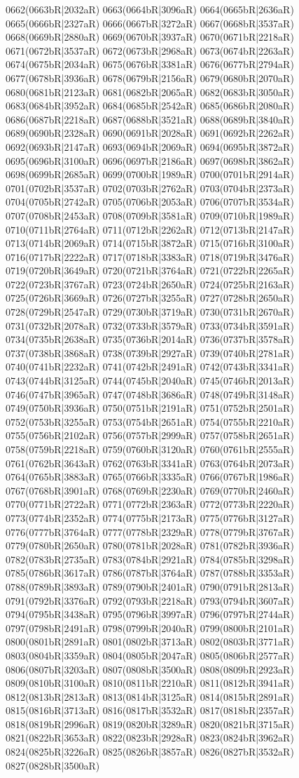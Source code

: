 0662(0663bR|2032aR) 0663(0664bR|3096aR) 0664(0665bR|2636aR) 0665(0666bR|2327aR) 0666(0667bR|3272aR) 0667(0668bR|3537aR) 0668(0669bR|2880aR) 0669(0670bR|3937aR) 0670(0671bR|2218aR) 0671(0672bR|3537aR) 0672(0673bR|2968aR) 0673(0674bR|2263aR) 0674(0675bR|2034aR) 0675(0676bR|3381aR) 0676(0677bR|2794aR) 0677(0678bR|3936aR) 0678(0679bR|2156aR) 0679(0680bR|2070aR) 0680(0681bR|2123aR) 0681(0682bR|2065aR) 0682(0683bR|3050aR) 0683(0684bR|3952aR) 0684(0685bR|2542aR) 0685(0686bR|2080aR) 0686(0687bR|2218aR) 0687(0688bR|3521aR) 0688(0689bR|3840aR) 0689(0690bR|2328aR) 0690(0691bR|2028aR) 0691(0692bR|2262aR) 0692(0693bR|2147aR) 0693(0694bR|2069aR) 0694(0695bR|3872aR) 0695(0696bR|3100aR) 0696(0697bR|2186aR) 0697(0698bR|3862aR) 0698(0699bR|2685aR) 0699(0700bR|1989aR) 0700(0701bR|2914aR) 0701(0702bR|3537aR) 0702(0703bR|2762aR) 0703(0704bR|2373aR) 0704(0705bR|2742aR) 0705(0706bR|2053aR) 0706(0707bR|3534aR) 0707(0708bR|2453aR) 0708(0709bR|3581aR) 0709(0710bR|1989aR) 0710(0711bR|2764aR) 0711(0712bR|2262aR) 0712(0713bR|2147aR) 0713(0714bR|2069aR) 0714(0715bR|3872aR) 0715(0716bR|3100aR) 0716(0717bR|2222aR) 0717(0718bR|3383aR) 0718(0719bR|3476aR) 0719(0720bR|3649aR) 0720(0721bR|3764aR) 0721(0722bR|2265aR) 0722(0723bR|3767aR) 0723(0724bR|2650aR) 0724(0725bR|2163aR) 0725(0726bR|3669aR) 0726(0727bR|3255aR) 0727(0728bR|2650aR) 0728(0729bR|2547aR) 0729(0730bR|3719aR) 0730(0731bR|2670aR) 0731(0732bR|2078aR) 0732(0733bR|3579aR) 0733(0734bR|3591aR) 0734(0735bR|2638aR) 0735(0736bR|2014aR) 0736(0737bR|3578aR) 0737(0738bR|3868aR) 0738(0739bR|2927aR) 0739(0740bR|2781aR) 0740(0741bR|2232aR) 0741(0742bR|2491aR) 0742(0743bR|3341aR) 0743(0744bR|3125aR) 0744(0745bR|2040aR) 0745(0746bR|2013aR) 0746(0747bR|3965aR) 0747(0748bR|3686aR) 0748(0749bR|3148aR) 0749(0750bR|3936aR) 0750(0751bR|2191aR) 0751(0752bR|2501aR) 0752(0753bR|3255aR) 0753(0754bR|2651aR) 0754(0755bR|2210aR) 0755(0756bR|2102aR) 0756(0757bR|2999aR) 0757(0758bR|2651aR) 0758(0759bR|2218aR) 0759(0760bR|3120aR) 0760(0761bR|2555aR) 0761(0762bR|3643aR) 0762(0763bR|3341aR) 0763(0764bR|2073aR) 0764(0765bR|3883aR) 0765(0766bR|3335aR) 0766(0767bR|1986aR) 0767(0768bR|3901aR) 0768(0769bR|2230aR) 0769(0770bR|2460aR) 0770(0771bR|2722aR) 0771(0772bR|2363aR) 0772(0773bR|2220aR) 0773(0774bR|2352aR) 0774(0775bR|2173aR) 0775(0776bR|3127aR) 0776(0777bR|3764aR) 0777(0778bR|2329aR) 0778(0779bR|3767aR) 0779(0780bR|2650aR) 0780(0781bR|2028aR) 0781(0782bR|3936aR) 0782(0783bR|2735aR) 0783(0784bR|2921aR) 0784(0785bR|3298aR) 0785(0786bR|3617aR) 0786(0787bR|3764aR) 0787(0788bR|3353aR) 0788(0789bR|3893aR) 0789(0790bR|2401aR) 0790(0791bR|2813aR) 0791(0792bR|3376aR) 0792(0793bR|2218aR) 0793(0794bR|3607aR) 0794(0795bR|3438aR) 0795(0796bR|3997aR) 0796(0797bR|2744aR) 0797(0798bR|2491aR) 0798(0799bR|2040aR) 0799(0800bR|2101aR) 0800(0801bR|2891aR) 0801(0802bR|3713aR) 0802(0803bR|3771aR) 0803(0804bR|3359aR) 0804(0805bR|2047aR) 0805(0806bR|2577aR) 0806(0807bR|3203aR) 0807(0808bR|3500aR) 0808(0809bR|2923aR) 0809(0810bR|3100aR) 0810(0811bR|2210aR) 0811(0812bR|3941aR) 0812(0813bR|2813aR) 0813(0814bR|3125aR) 0814(0815bR|2891aR) 0815(0816bR|3713aR) 0816(0817bR|3532aR) 0817(0818bR|2357aR) 0818(0819bR|2996aR) 0819(0820bR|3289aR) 0820(0821bR|3715aR) 0821(0822bR|3653aR) 0822(0823bR|2928aR) 0823(0824bR|3962aR) 0824(0825bR|3226aR) 0825(0826bR|3857aR) 0826(0827bR|3532aR) 0827(0828bR|3500aR) 